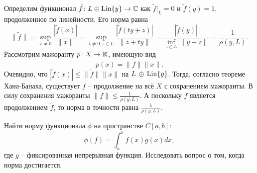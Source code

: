 \begin{solution}
    Определим функционал $\tilde{f}\colon L \oplus \operatorname{Lin}\{y\} \to \mathbb{C}$ как $\tilde{f}|_L = 0$ и $\tilde{f}(y) = 1$, продолженное по линейности.
    Его норма равна
    \[
        \|\tilde{f}\| = \sup_{x \neq 0} \frac{|\tilde{f}(x)|}{\|x\|} = \sup_{t \neq 0, z \in L} \frac{|\tilde{f}(ty + z)|}{\|z + ty\|} = \frac{|\tilde{f}(y)|}{\inf_{z \in L} \|y - z\|} = \frac{1}{\rho(y, L)}.
    \]
    Рассмотрим мажоранту $p\colon X \to \mathbb{R}$, имеющую вид
    \[
        p(x) = \|\tilde{f}\|\|x\|.
    \]
    Очевидно, что $|\tilde{f}(x)| \leq \|\tilde{f}\|\|x\|$ на $L \, \oplus \, \operatorname{Lin}\{y\}$.
    Тогда, согласно теореме Хана-Банаха, существует $f$ -- продолжение на всё $X$ с сохранением мажоранты.
    В силу сохранения мажоранты $\|f\| \leq \frac{1}{\rho(y, L)}$.
    А поскольку $f$ является продолжением $\tilde{f}$, то норма в точности равна $\frac{1}{\rho(y, L)}$.
\end{solution}
\begin{task}[9.11]
    Найти норму функционала $\phi$ на пространстве $C[a, b]\colon$
    \[
        \phi(f) = \int_a^b f(x)g(x)dx,
    \]
    где $g$ -- фиксированная непрерывная функция.
    Исследовать вопрос о том, когда норма достигается.
\end{task}
